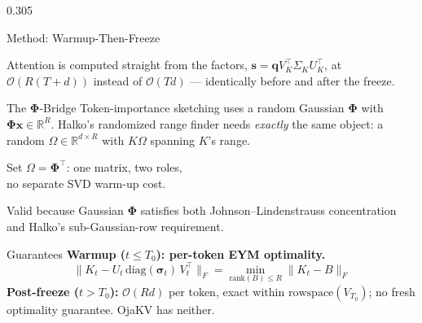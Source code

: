 \documentclass[final]{beamer}
\newcommand{\R}{\mathbb{R}}
\let\PhiSymbol\Phi
\renewcommand{\Phi}{\boldsymbol{\PhiSymbol}}
\newcommand{\takeaway}[1]{%
  \begin{center}
  \colorbox{soft}{\parbox{0.96\linewidth}{\vspace{0.35cm}\centering\large #1\vspace{0.35cm}}}
  \end{center}}
\begin{document}
\begin{frame}[t]
\begin{columns}[t]
\begin{column}{0.305\paperwidth}
\begin{block}{Method: Warmup-Then-Freeze}
\begin{center}
\end{center}
\vspace{0.3cm}
Attention is computed straight from the factors,
$\mathbf{s} = \mathbf{q} V_K^\top \Sigma_K U_K^\top$, at
$\mathcal{O}(R(T{+}d))$ instead of $\mathcal{O}(Td)$ --- identically before
and after the freeze.
\end{block}

\begin{block}{The $\Phi$-Bridge}
Token-importance sketching uses a random Gaussian $\Phi$ with
$\Phi\mathbf{x}\in\R^R$. Halko's randomized range finder needs \emph{exactly}
the same object: a random $\Omega\in\R^{d\times R}$ with $K\Omega$ spanning $K$'s range.
\takeaway{Set $\Omega = \Phi^\top$: one matrix, two roles,\\ no separate SVD warm-up cost.}
Valid because Gaussian $\Phi$ satisfies both Johnson--Lindenstrauss
concentration and Halko's sub-Gaussian-row requirement.
\end{block}

\begin{block}{Guarantees}
\textbf{Warmup ($t\le T_0$): per-token EYM optimality.}
\[
\| K_t - U_t\,\mathrm{diag}(\boldsymbol{\sigma}_t)\,V_t^\top \|_F
  = \min_{\mathrm{rank}(B)\le R} \| K_t - B \|_F
\]
\textbf{Post-freeze ($t > T_0$):} $\mathcal{O}(Rd)$ per token, exact within
$\mathrm{rowspace}(V_{T_0})$; no fresh optimality guarantee.
OjaKV has neither.


\end{block}
\end{column}
\end{columns}
\end{frame}
\end{document}
